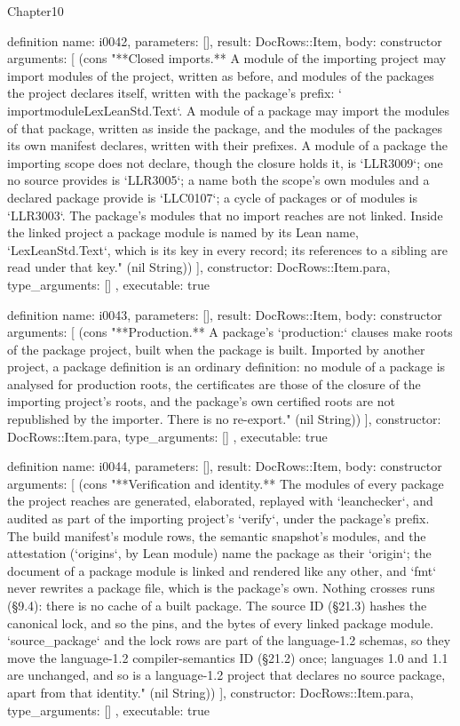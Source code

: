 \begin{lexlean}{Chapter10}
\begin{semanticmodule}
definition{
  name: i0042,
  parameters: [],
  result: DocRows::Item,
  body: constructor{
    arguments: [
      (cons "**Closed imports.** A module of the importing project may import modules of the project, written as before, and modules of the packages the project declares itself, written with the package's prefix: `\\importmodule{LexLeanStd.Text}`. A module of a package may import the modules of that package, written as inside the package, and the modules of the packages its own manifest declares, written with their prefixes. A module of a package the importing scope does not declare, though the closure holds it, is `LLR3009`; one no source provides is `LLR3005`; a name both the scope's own modules and a declared package provide is `LLC0107`; a cycle of packages or of modules is `LLR3003`. The package's modules that no import reaches are not linked. Inside the linked project a package module is named by its Lean name, `LexLeanStd.Text`, which is its key in every record; its references to a sibling are read under that key." (nil String))
    ],
    constructor: DocRows::Item.para,
    type_arguments: []
  },
  executable: true
}

definition{
  name: i0043,
  parameters: [],
  result: DocRows::Item,
  body: constructor{
    arguments: [
      (cons "**Production.** A package's `production:` clauses make roots of the package project, built when the package is built. Imported by another project, a package definition is an ordinary definition: no module of a package is analysed for production roots, the certificates are those of the closure of the importing project's roots, and the package's own certified roots are not republished by the importer. There is no re-export." (nil String))
    ],
    constructor: DocRows::Item.para,
    type_arguments: []
  },
  executable: true
}

definition{
  name: i0044,
  parameters: [],
  result: DocRows::Item,
  body: constructor{
    arguments: [
      (cons "**Verification and identity.** The modules of every package the project reaches are generated, elaborated, replayed with `leanchecker`, and audited as part of the importing project's `verify`, under the package's prefix. The build manifest's module rows, the semantic snapshot's modules, and the attestation (`origins`, by Lean module) name the package as their `origin`; the document of a package module is linked and rendered like any other, and `fmt` never rewrites a package file, which is the package's own. Nothing crosses runs (§9.4): there is no cache of a built package. The source ID (§21.3) hashes the canonical lock, and so the pins, and the bytes of every linked package module. `source_package` and the lock rows are part of the language-1.2 schemas, so they move the language-1.2 compiler-semantics ID (§21.2) once; languages 1.0 and 1.1 are unchanged, and so is a language-1.2 project that declares no source package, apart from that identity." (nil String))
    ],
    constructor: DocRows::Item.para,
    type_arguments: []
  },
  executable: true
}


\end{semanticmodule}
\end{lexlean}
